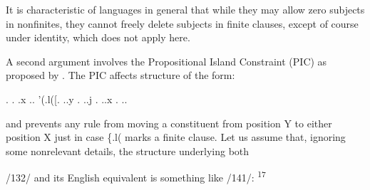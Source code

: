 It is characteristic of languages in general that while they may allow zero subjects in nonfinites, they cannot freely delete subjects in finite clauses, except of course under identity, which does not apply here.

A second argument involves the Propositional Island Constraint (PIC) as proposed by \citet{Chomsky1977}. The PIC affects structure of the form:

\ea\label{ex:140}
 . . .x .. '(.l([. ..y . ..j . ..x . ..
\glt
\z

and prevents any rule from moving a constituent from position Y to either position X just in case \{.l( marks a finite clause. Let us assume that, ignoring some nonrelevant details, the structure underlying both

/132/ and its English equivalent is something like /141/: \textsuperscript{17}

